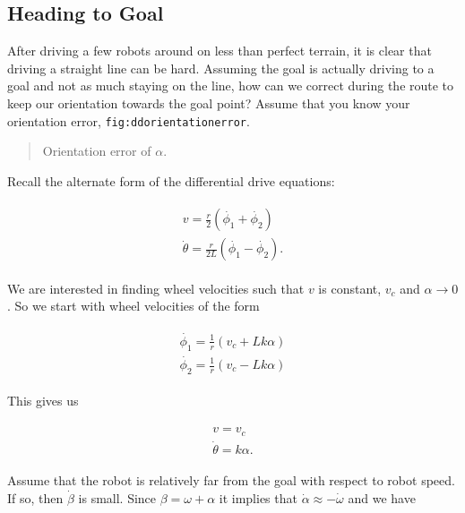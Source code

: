 \hypertarget{heading-to-goal}{%
\subsection{Heading to Goal}\label{heading-to-goal}}

After driving a few robots around on less than perfect terrain, it is
clear that driving a straight line can be hard. Assuming the goal is
actually driving to a goal and not as much staying on the line, how can
we correct during the route to keep our orientation towards the goal
point? Assume that you know your orientation error,
\texttt{fig:ddorientationerror}.

\begin{quote}
Orientation error of \(\alpha\).
\end{quote}

Recall the alternate form of the differential drive equations:

\[\begin{aligned}
\begin{array}{l}
v = \frac{r}{2} (\dot{\phi_1}+\dot{\phi_2}) \\[3mm]
\dot{\theta} = \frac{r}{2L} (\dot{\phi_1}-\dot{\phi_2}) .
\end{array}
\end{aligned}\]

We are interested in finding wheel velocities such that \(v\) is
constant, \(v_c\) and \(\alpha \to 0\). So we start with wheel
velocities of the form

\[\begin{aligned}
\begin{array}{l}
\dot{\phi_1} = \frac{1}{r} (v_c+Lk\alpha)\\[3mm]
\dot{\phi_2} = \frac{1}{r} (v_c-Lk\alpha)
\end{array}
\end{aligned}\]

This gives us

\[\begin{aligned}
\begin{array}{l}
v = v_c \\[3mm]
\dot{\theta} = k\alpha .
\end{array}
\end{aligned}\]

Assume that the robot is relatively far from the goal with respect to
robot speed. If so, then \(\dot{\beta}\) is small. Since
\(\beta = \omega + \alpha\) it implies that
\(\dot{\alpha} \approx -\dot{\omega}\) and we have

